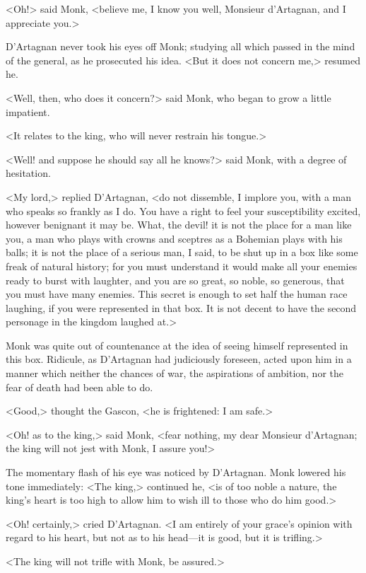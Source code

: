 <Oh!> said Monk, <believe me, I know you well, Monsieur d'Artagnan, and I appreciate you.>

D'Artagnan never took his eyes off Monk; studying all which passed in the mind of the general, as he prosecuted his idea. <But it does not concern me,> resumed he.

<Well, then, who does it concern?> said Monk, who began to grow a little impatient.

<It relates to the king, who will never restrain his tongue.>

<Well! and suppose he should say all he knows?> said Monk, with a degree of hesitation.

<My lord,> replied D'Artagnan, <do not dissemble, I implore you, with a man who speaks so frankly as I do. You have a right to feel your susceptibility excited, however benignant it may be. What, the devil! it is not the place for a man like you, a man who plays with crowns and sceptres as a Bohemian plays with his balls; it is not the place of a serious man, I said, to be shut up in a box like some freak of natural history; for you must understand it would make all your enemies ready to burst with laughter, and you are so great, so noble, so generous, that you must have many enemies. This secret is enough to set half the human race laughing, if you were represented in that box. It is not decent to have the second personage in the kingdom laughed at.>

Monk was quite out of countenance at the idea of seeing himself represented in this box. Ridicule, as D'Artagnan had judiciously foreseen, acted upon him in a manner which neither the chances of war, the aspirations of ambition, nor the fear of death had been able to do.

<Good,> thought the Gascon, <he is frightened: I am safe.>

<Oh! as to the king,> said Monk, <fear nothing, my dear Monsieur d'Artagnan; the king will not jest with Monk, I assure you!>

The momentary flash of his eye was noticed by D'Artagnan. Monk lowered his tone immediately: <The king,> continued he, <is of too noble a nature, the king's heart is too high to allow him to wish ill to those who do him good.>

<Oh! certainly,> cried D'Artagnan. <I am entirely of your grace's opinion with regard to his heart, but not as to his head—it is good, but it is trifling.>

<The king will not trifle with Monk, be assured.>

